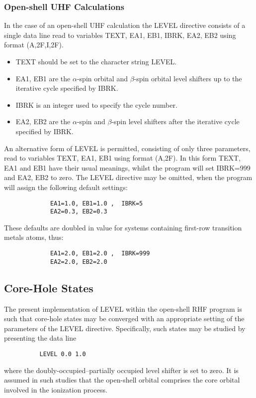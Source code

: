 \documentclass[11pt,fleqn]{article}
\begin{document}
\subsubsection{Open-shell UHF Calculations} 

In the case of an open-shell UHF  calculation the LEVEL directive
consists of a single  data line read to 
variables TEXT, EA1, EB1, IBRK, EA2, EB2 using format (A,2F,I,2F).
\begin{itemize}
\item TEXT should be set to the character string LEVEL.
\item  EA1, EB1 are the  $\alpha$-spin orbital 
and $\beta$-spin  orbital
level shifters up to the iterative cycle specified by IBRK.
\item  IBRK is an integer used to  specify the cycle number.
\item  EA2, EB2 are the  $\alpha$-spin and $\beta$-spin
level shifters after the iterative cycle specified by IBRK.
\end{itemize}
An alternative form of LEVEL is permitted, consisting of only three
parameters, read to variables TEXT, EA1, EB1 using 
format (A,2F). In this form
TEXT, EA1 and EB1 have their usual meanings, whilst the program will set
IBRK=999 and EA2, EB2 to zero.
The LEVEL directive may be omitted, when the program will assign the
following default settings:

{
\footnotesize
\begin{verbatim}
             EA1=1.0, EB1=1.0 ,  IBRK=5
             EA2=0.3, EB2=0.3
\end{verbatim}
}
These defaults are doubled in value for systems containing first-row
transition metals atoms, thus:

{
\footnotesize
\begin{verbatim}
             EA1=2.0, EB1=2.0 ,  IBRK=999
             EA2=2.0, EB2=2.0
\end{verbatim}
}

\subsection[Core-Hole States]{Core-Hole States}

The present implementation of LEVEL within the open-shell RHF program
is such that core-hole states may be converged with an appropriate
setting of the parameters of the LEVEL directive. Specifically, such
states may be studied by presenting the data line

{
\footnotesize
\begin{verbatim}
          LEVEL 0.0 1.0
\end{verbatim}
}
where the doubly-occupied--partially occupied level shifter
is set to zero. It is assumed in such studies that the
open-shell orbital comprises the core orbital involved
in the ionization process.\\
\end{document}
